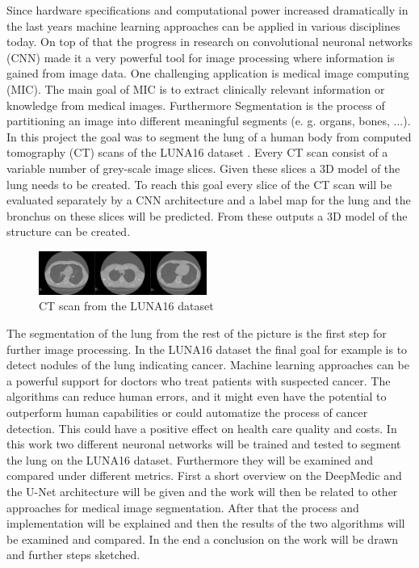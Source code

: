 
Since hardware specifications and computational power increased dramatically in the last years machine learning approaches can be applied in various disciplines today. On top of that the progress in research on convolutional neuronal networks (CNN) made it a very powerful tool for image processing where information is gained from image data.\newline
One challenging application is medical image computing (MIC). The main goal of MIC is to extract clinically relevant information or knowledge from medical images. Furthermore Segmentation is the process of partitioning an image into different meaningful segments (e. g. organs, bones, ...).\newline
In this project the goal was to segment the lung of a human body from computed tomography (CT) scans of the LUNA16 dataset \cite{luna}. Every CT scan consist of a variable number of grey-scale image slices. Given these slices a 3D model of the lung needs to be created. To reach this goal every slice of the CT scan will be evaluated separately by a CNN architecture and a label map for the lung and the bronchus on these slices will be predicted. From these outputs a 3D model of the structure can be created. \newline

\begin{figure}[h!]
	\includegraphics[width=0.49\textwidth, angle=0]{files/ctscans.jpg}
	\caption{CT scan from the LUNA16 dataset}
	\label{scan_picture}
\end{figure}

The segmentation of the lung from the rest of the picture is the first step for further image processing. In the LUNA16 dataset the final goal for example is to detect nodules of the lung indicating cancer. Machine learning approaches can be a powerful support for doctors who treat patients with suspected cancer. The algorithms can reduce human errors, and it might even have the potential to outperform human capabilities or could automatize the process of cancer detection. This could have a positive effect on health care quality and costs.\newline
In this work two different neuronal networks will be trained and tested to segment the lung on the LUNA16 dataset. Furthermore they will be examined and compared under different metrics.\newline
First a short overview on the DeepMedic and the U-Net architecture will be given and the work will then be related to other approaches for medical image segmentation. After that the process and implementation will be explained and then the results of the two algorithms will be examined and compared. In the end a conclusion on the work will be drawn and further steps sketched.
